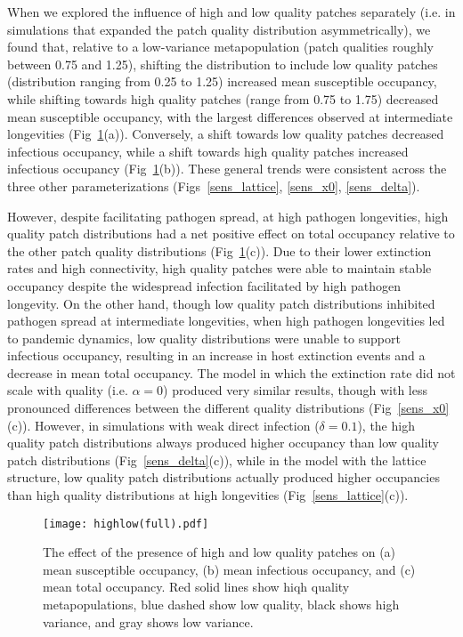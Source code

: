 \documentclass{svjour3}
\begin{document}
When we explored the influence of high and low quality patches separately (i.e. in simulations that expanded the patch quality distribution asymmetrically), we found that, relative to a low-variance metapopulation (patch qualities roughly between 0.75 and 1.25), shifting the distribution to include low quality patches (distribution ranging from 0.25 to 1.25) increased mean susceptible occupancy, while shifting towards high quality patches (range from 0.75 to 1.75) decreased mean susceptible occupancy, with the largest differences observed at intermediate longevities (Fig~\ref{sens}(a)).  Conversely, a shift towards low quality patches decreased infectious occupancy, while a shift towards high quality patches increased infectious occupancy (Fig~\ref{sens}(b)).  These general trends were consistent across the three other parameterizations (Figs~\ref{sens_lattice}, \ref{sens_x0}, \ref{sens_delta}).  

However, despite facilitating pathogen spread, at high pathogen longevities, high quality patch distributions had a net positive effect on total occupancy relative to the other patch quality distributions (Fig~\ref{sens}(c)).  Due to their lower extinction rates and high connectivity, high quality patches were able to maintain stable occupancy despite the widespread infection facilitated by high pathogen longevity.  On the other hand, though low quality patch distributions inhibited pathogen spread at intermediate longevities, when high pathogen longevities led to pandemic dynamics, low quality distributions were unable to support infectious occupancy, resulting in an increase in host extinction events and a decrease in mean total occupancy.  The model in which the extinction rate did not scale with quality (i.e. $\alpha = 0$) produced very similar results, though with less pronounced differences between the different quality distributions (Fig~\ref{sens_x0}(c)).  However, in simulations with weak direct infection ($\delta = 0.1$), the high quality patch distributions always produced higher occupancy than low quality patch distributions (Fig~\ref{sens_delta}(c)), while in the model with the lattice structure, low quality patch distributions actually produced higher occupancies than high quality distributions at high longevities (Fig~\ref{sens_lattice}(c)).

\begin{figure}
\centering
\texttt{[image: highlow(full).pdf]}
\caption{The effect of the presence of high and low quality patches on (a) mean susceptible occupancy, (b) mean infectious occupancy, and (c) mean total occupancy.  Red solid lines show hiqh quality metapopulations, blue dashed show low quality, black shows high variance, and gray shows low variance.}
\label{sens}
\end{figure}
\end{document}
